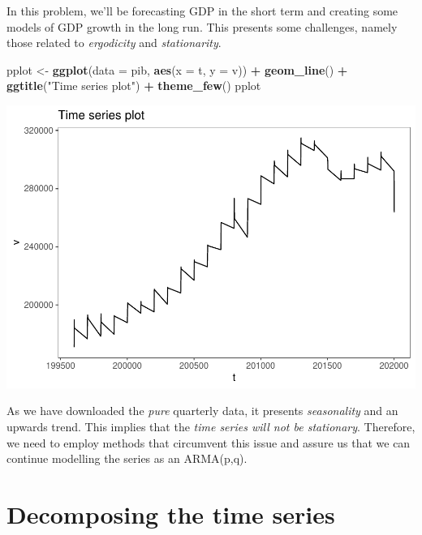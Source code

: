 \documentclass[11pt, a4paper]{report}
\newenvironment{Shaded}{\begin{snugshade}}{\end{snugshade}}
\newcommand{\DataTypeTok}[1]{\textcolor[rgb]{0.13,0.29,0.53}{#1}}
\newcommand{\KeywordTok}[1]{\textcolor[rgb]{0.13,0.29,0.53}{\textbf{#1}}}
\newcommand{\NormalTok}[1]{#1}
\newcommand{\OperatorTok}[1]{\textcolor[rgb]{0.81,0.36,0.00}{\textbf{#1}}}
\newcommand{\StringTok}[1]{\textcolor[rgb]{0.31,0.60,0.02}{#1}}
\theoremstyle{plain}
\theoremstyle{plain}
\theoremstyle{remark}
\begin{document}
In this problem, we'll be forecasting GDP in the short term and creating
some models of GDP growth in the long run. This presents some
challenges, namely those related to \emph{ergodicity} and
\emph{stationarity}.

\begin{Shaded}
	\begin{Highlighting}[]
		\NormalTok{pplot <-}\StringTok{ }\KeywordTok{ggplot}\NormalTok{(}\DataTypeTok{data =}\NormalTok{ pib, }\KeywordTok{aes}\NormalTok{(}\DataTypeTok{x =}\NormalTok{ t, }\DataTypeTok{y =}\NormalTok{ v)) }\OperatorTok{+}\StringTok{ }\KeywordTok{geom_line}\NormalTok{() }\OperatorTok{+}\StringTok{ }
		\StringTok{    }\KeywordTok{ggtitle}\NormalTok{(}\StringTok{"Time series plot"}\NormalTok{) }\OperatorTok{+}\StringTok{ }\KeywordTok{theme_few}\NormalTok{()}
		\NormalTok{pplot}
	\end{Highlighting}
\end{Shaded}

\begin{center}\includegraphics{Econo2_P5_files/figure-latex/plots-1} \end{center}

As we have downloaded the \emph{pure} quarterly data, it presents
\emph{seasonality} and an upwards trend. This implies that the
\emph{time series will not be stationary}. Therefore, we need to employ
methods that circumvent this issue and assure us that we can continue
modelling the series as an ARMA(p,q).

\section{Decomposing the time series}
\end{document}
